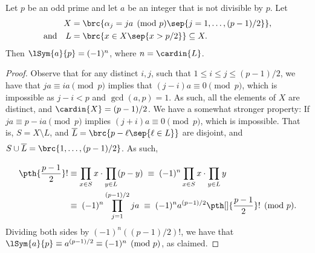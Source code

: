 \begin{lemma}
    Let $p$ be an odd prime and let $a$ be an integer that is not
    divisible by $p$. Let
    \begin{align*}
        X &= \brc{ \alpha_ j = ja
           \pmod{p}\sep{j=1,\ldots, (p-1)/2}},\\
        \text{and}\quad
        L &= { \brc{ x \in X \sep{ x > p/2}} } \subseteq X.
    \end{align*}
    Then $\lSym{a}{p} = (-1)^n$, where $n = \cardin{L}$.
\end{lemma}
\begin{proof}
    Observe that for any distinct $i,j$, such that $1\leq i\leq j\leq
    (p-1)/2$, we have that $ja \equiv ia \pmod{p}$ implies that $(j-i)
    a \equiv 0 \pmod{p}$, which is impossible as $j-i < p$ and
    $\gcd(a,p) = 1$. As such, all the elements of $X$ are distinct,
    and $\cardin{X} = (p-1)/2$. We have a somewhat stronger property:
    If $ja \equiv p - ia \pmod{p}$ implies $(j+i)a \equiv 0 \pmod{p}$,
    which is impossible. That is, $S =X \setminus L$, and
    $\overline{L} = \brc{ p -\ell \sep{\ell \in L}}$ are disjoint, and
    $S \cup \overline{L} = \brc{1,\ldots, (p-1)/2\biggl.}$. As such,
    \begin{align*} 
        \pth{\frac{p-1}{2}}!%
        &\equiv%
        \prod_{x \in S} x \cdot \prod_{y \in L} (p-y)%
        \;\equiv\;%
        (-1)^n \prod_{x \in S} x \cdot \prod_{y \in L} y\\
        &\equiv\;%
        (-1)^n \prod_{j=1}^{(p-1)/2} j a%
        \;\equiv\;%
        (-1)^n a^{(p-1)/2} \pth[]{\frac{p-1}{2}}! %
        \pmod{p}.
    \end{align*}
    Dividing both sides by $(-1)^n((p-1)/2)!$, we have that
    $\lSym{a}{p} \equiv a^{(p-1)/2} \equiv (-1)^n \pmod{p}$, as
    claimed.
\end{proof}



